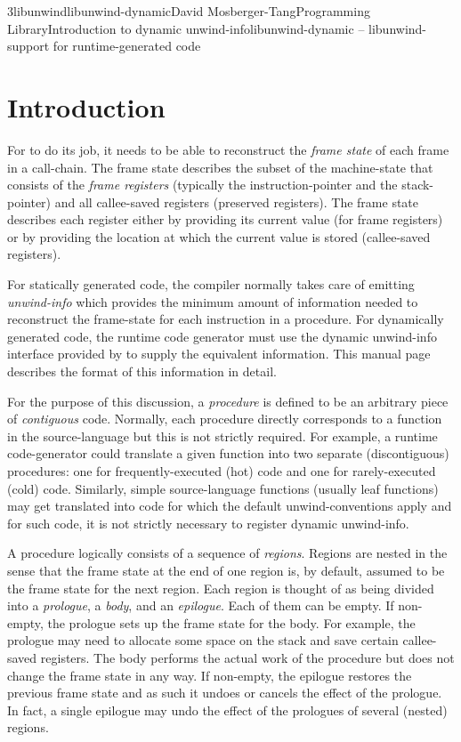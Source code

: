 \documentclass{article}
\begin{document}
\begin{Name}{3libunwind}{libunwind-dynamic}{David Mosberger-Tang}{Programming Library}{Introduction to dynamic unwind-info}libunwind-dynamic -- libunwind-support for runtime-generated code
\end{Name}

\section{Introduction}

For  to do its job, it needs to be able to reconstruct
the \emph{frame state} of each frame in a call-chain.  The frame state
describes the subset of the machine-state that consists of the
\emph{frame registers} (typically the instruction-pointer and the
stack-pointer) and all callee-saved registers (preserved registers).
The frame state describes each register either by providing its
current value (for frame registers) or by providing the location at
which the current value is stored (callee-saved registers).

For statically generated code, the compiler normally takes care of
emitting \emph{unwind-info} which provides the minimum amount of
information needed to reconstruct the frame-state for each instruction
in a procedure.  For dynamically generated code, the runtime code
generator must use the dynamic unwind-info interface provided by
 to supply the equivalent information.  This manual
page describes the format of this information in detail.

For the purpose of this discussion, a \emph{procedure} is defined to
be an arbitrary piece of \emph{contiguous} code.  Normally, each
procedure directly corresponds to a function in the source-language
but this is not strictly required.  For example, a runtime
code-generator could translate a given function into two separate
(discontiguous) procedures: one for frequently-executed (hot) code and
one for rarely-executed (cold) code.  Similarly, simple
source-language functions (usually leaf functions) may get translated
into code for which the default unwind-conventions apply and for such
code, it is not strictly necessary to register dynamic unwind-info.

A procedure logically consists of a sequence of \emph{regions}.
Regions are nested in the sense that the frame state at the end of one
region is, by default, assumed to be the frame state for the next
region.  Each region is thought of as being divided into a
\emph{prologue}, a \emph{body}, and an \emph{epilogue}.  Each of them
can be empty.  If non-empty, the prologue sets up the frame state for
the body.  For example, the prologue may need to allocate some space
on the stack and save certain callee-saved registers.  The body
performs the actual work of the procedure but does not change the
frame state in any way.  If non-empty, the epilogue restores the
previous frame state and as such it undoes or cancels the effect of
the prologue.  In fact, a single epilogue may undo the effect of the
prologues of several (nested) regions.
\end{document}
